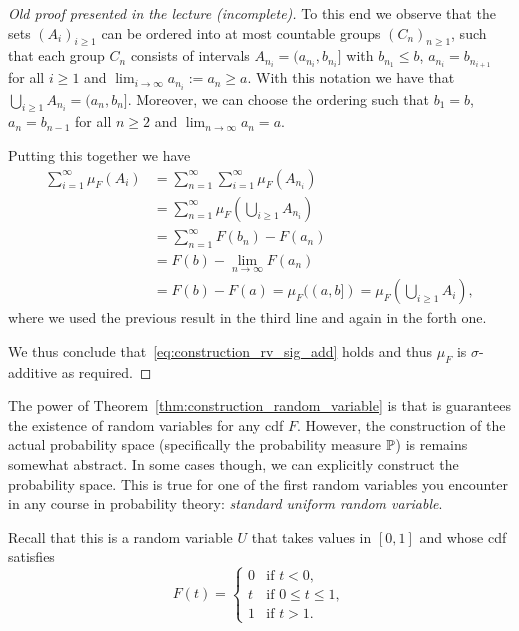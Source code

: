 \begin{proof}[Old proof presented in the lecture (incomplete)]
To this end we observe that the sets $(A_i)_{i \ge 1}$ can be ordered into at most countable groups $(C_n)_{n \ge 1}$, such that each group $C_n$ consists of intervals $A_{n_i} = (a_{n_i}, b_{n_i}]$ with $b_{n_1} \le b$, $a_{n_{i}} = b_{n_{i+1}}$ for all $i \ge 1$ and $\lim_{i \to \infty} a_{n_i} := a_n \ge a$. With this notation we have that $\bigcup_{i \ge 1} A_{n_i} = (a_n, b_n]$. Moreover, we can choose the ordering such that $b_1 = b$, $a_n = b_{n-1}$ for all $n \ge 2$ and $\lim_{n \to \infty} a_n = a$.

Putting this together we have
\begin{align*}
	\sum_{i = 1}^\infty \mu_F(A_i) &= \sum_{n = 1}^\infty \sum_{i = 1}^\infty \mu_F(A_{n_i}) \\
	&= \sum_{n = 1}^\infty \mu_F(\bigcup_{i \ge 1} A_{n_i})\\
	&= \sum_{n = 1}^\infty F(b_n) - F(a_n) \\
	&= F(b) - \lim_{n \to \infty} F(a_n) \\
	&= F(b) - F(a) = \mu_F((a,b]) = \mu_F(\bigcup_{i \ge 1} A_i),
\end{align*}
where we used the previous result in the third line and again in the forth one.

We thus conclude that~\eqref{eq:construction_rv_sig_add} holds and thus $\mu_F$ is $\sigma$-additive as required.

\end{proof}


The power of Theorem~\ref{thm:construction_random_variable} is that is guarantees the existence of random variables for any cdf $F$. However, the construction of the actual probability space (specifically the probability measure $\mathbb P$) is remains somewhat abstract. In some cases though, we can explicitly construct the probability space. This is true for one of the first random variables you encounter in any course in probability theory: \emph{standard uniform random variable}. 

Recall that this is a random variable $U$ that takes values in $[0,1]$ and whose cdf satisfies 
\begin{equation}\label{eq:cdf_uniform_rv}
	F(t) = \begin{cases}
		0 &\text{if } t < 0,\\
		t &\text{if } 0 \le t\le 1,\\
		1 &\text{if } t > 1.
	\end{cases}
\end{equation}

